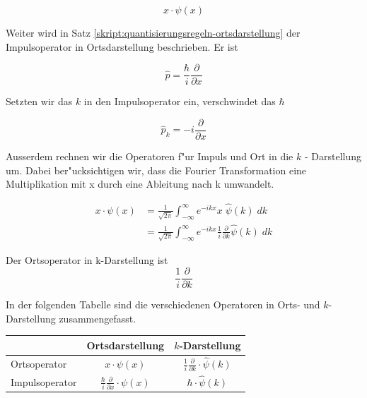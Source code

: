 \begin{refsection}
\begin{equation}
 x \cdot\psi(x)
\end{equation}

Weiter wird in Satz \ref{skript:quantisierungsregeln-ortsdarstellung} der Impulsoperator in Ortsdarstellung beschrieben. Er ist

\begin{equation}
 \hat p  =\frac{\hbar}{i}\frac{\partial}{\partial x}
\end{equation}

Setzten wir das $k$ in den Impulsoperator ein, verschwindet das $\hbar$

\begin{equation}
\hat p_{k} = -i\frac{\partial}{\partial x}
\end{equation}

Ausserdem rechnen wir die Operatoren f"ur Impuls und Ort in die $k$ - Darstellung um. Dabei ber"ucksichtigen wir, dass die Fourier Transformation eine Multiplikation mit x durch eine Ableitung nach k umwandelt. 

\begin{align}
x\cdot\psi(x) &= \frac{1}{\sqrt{2\pi }} \int_{-\infty}^{\infty} e^{-ikx} x \;\hat{\psi}(k) \; dk\\
&= \frac{1}{\sqrt{2\pi }} \int_{-\infty}^{\infty} e^{-ikx} \frac{1}{i}\frac{\partial}{\partial k} \hat{\psi}(k) \; dk
\end{align}

Der Ortsoperator in k-Darstellung ist 
\begin{equation}
\frac{1}{i}\frac{\partial}{\partial k}
\end{equation}

In der folgenden Tabelle sind die verschiedenen Operatoren in Orts- und $k$-Darstellung zusammengefasst.

\begin{center}
\renewcommand{\arraystretch}{1.25}
\begin{tabular}{|l|c|c|}
\hline
& Ortsdarstellung & $k$-Darstellung\\
\hline
Ortsoperator & $x \cdot \psi(x) $ & $\frac{1}{i}\frac{\partial}{\partial k} \cdot \hat{\psi}(k)$\\
 \hline
Impulsoperator & $\frac{\hbar}{i}\frac{\partial}{\partial x} \cdot \psi(x)$ & $\hbar \cdot \hat{\psi}(k)$\\
\hline
\end{tabular}
\renewcommand{\arraystretch}{1}
\end{center}



\end{refsection}
